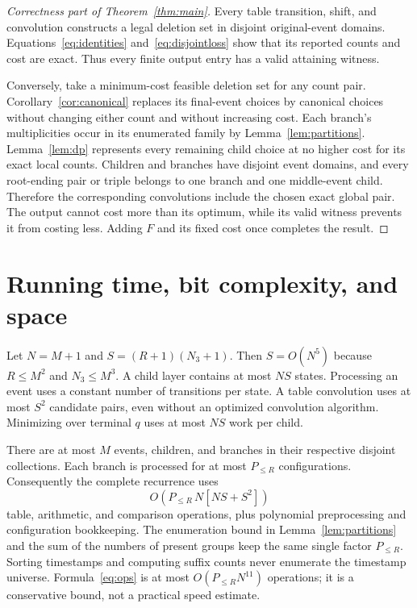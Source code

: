 \documentclass[11pt]{article}
\theoremstyle{remark}
\newcommand{\Ppart}{P_{\le R}}
\begin{document}
\begin{proof}[Correctness part of Theorem~\ref{thm:main}]
Every table transition, shift, and convolution constructs a legal deletion
set in disjoint original-event domains. Equations~\eqref{eq:identities}
and~\eqref{eq:disjointloss} show that its reported counts and cost are exact.
Thus every finite output entry has a valid attaining witness.

Conversely, take a minimum-cost feasible deletion set for any count pair.
Corollary~\ref{cor:canonical} replaces its final-event choices by canonical
choices without changing either count and without increasing cost. Each
branch's multiplicities occur in its enumerated family by
Lemma~\ref{lem:partitions}. Lemma~\ref{lem:dp} represents every remaining
child choice at no higher cost for its exact local counts. Children and
branches have disjoint event domains, and every root-ending pair or triple
belongs to one branch and one middle-event child. Therefore the corresponding
convolutions include the chosen exact global pair. The output cannot cost
more than its optimum, while its valid witness prevents it from costing less.
Adding $F$ and its fixed cost once completes the result.
\end{proof}

\section{Running time, bit complexity, and space}\label{sec:complexity}

Let $N=M+1$ and $S=(R+1)(N_3+1)$. Then $S=O(N^5)$ because $R\le M^2$
and $N_3\le M^3$. A child layer contains at most $NS$ states. Processing an
event uses a constant number of transitions per state. A table convolution
uses at most $S^2$ candidate pairs, even without an optimized convolution
algorithm. Minimizing over terminal $q$ uses at most $NS$ work per child.

There are at most $M$ events, children, and branches in their respective
disjoint collections. Each branch is processed for at most $\Ppart$
configurations. Consequently the complete recurrence uses
\begin{equation}
 O\!\left(\Ppart\,N[NS+S^2]\right)
 \label{eq:ops}
\end{equation}
table, arithmetic, and comparison operations, plus polynomial preprocessing
and configuration bookkeeping. The enumeration bound in
Lemma~\ref{lem:partitions} and the sum of the numbers of present groups keep
the same single factor $\Ppart$. Sorting timestamps and computing suffix
counts never enumerate the timestamp universe. Formula~\eqref{eq:ops} is at
most $O(\Ppart N^{11})$ operations; it is a conservative bound, not a practical
speed estimate.
\end{document}
